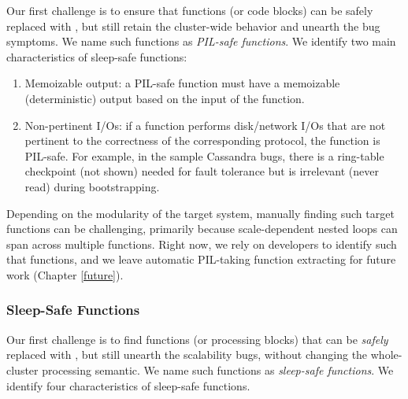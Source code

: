 Our first challenge is to ensure that functions (or code blocks) can be safely
replaced with \sleep, but still retain the cluster-wide behavior and unearth the
bug symptoms.  We name such functions as {\em PIL-safe functions}.
%
We identify two main characteristics of sleep-safe functions:
\begin{enumerate}
\item Memoizable output: a PIL-safe function must have a memoizable
(deterministic) output based on the input of the function.
\item Non-pertinent I/Os: if a function performs disk/network I/Os that are not
pertinent to the correctness of the corresponding protocol, the function is
PIL-safe.  For example, in the sample Cassandra bugs, there is a ring-table
checkpoint (not shown) needed for fault tolerance but is irrelevant (never read)
during bootstrapping.
%
\end{enumerate}
Depending on the modularity of the target system, manually finding such target
functions can be challenging, primarily because scale-dependent nested loops can
span across multiple functions. Right now, we rely on developers to identify
such that functions, and we leave automatic PIL-taking function extracting for
future work (Chapter \ref{future}).

\subsubsection{Sleep-Safe Functions}
\label{sc-pil-1}

Our first challenge is to find functions (or processing blocks) that can
be {\em safely} replaced with \sleep, but still unearth the scalability
bugs, without changing the whole-cluster processing semantic.
%
We name such functions as {\em sleep-safe functions}.  
%
We identify four characteristics of sleep-safe functions.

